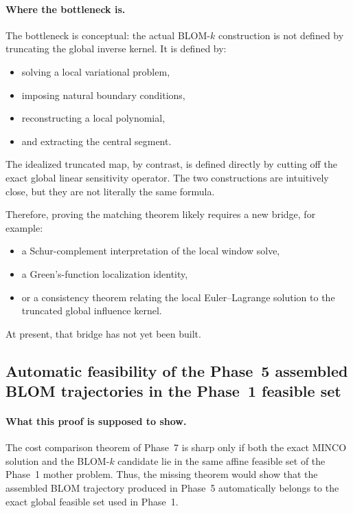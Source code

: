 \paragraph{Where the bottleneck is.}
The bottleneck is conceptual:
the actual BLOM-\(k\) construction is not defined by truncating the global inverse kernel.
It is defined by:
\begin{itemize}
	\item solving a local variational problem,
	\item imposing natural boundary conditions,
	\item reconstructing a local polynomial,
	\item and extracting the central segment.
\end{itemize}
The idealized truncated map, by contrast, is defined directly by cutting off the exact global linear sensitivity operator.
The two constructions are intuitively close, but they are not literally the same formula.

Therefore, proving the matching theorem likely requires a new bridge, for example:
\begin{itemize}
	\item a Schur-complement interpretation of the local window solve,
	\item a Green's-function localization identity,
	\item or a consistency theorem relating the local Euler--Lagrange solution to the truncated global influence kernel.
\end{itemize}
At present, that bridge has not yet been built.

\subsection{Automatic feasibility of the Phase~5 assembled BLOM trajectories in the Phase~1 feasible set}
\label{subsec:unfinished_feasibility}

\paragraph{What this proof is supposed to show.}
The cost comparison theorem of Phase~7 is sharp only if both the exact MINCO solution and the BLOM-\(k\) candidate lie in the same affine feasible set of the Phase~1 mother problem.
Thus, the missing theorem would show that the assembled BLOM trajectory produced in Phase~5 automatically belongs to the exact global feasible set used in Phase~1.

